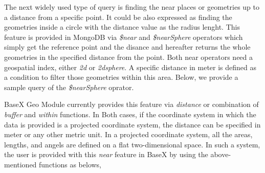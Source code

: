 \documentclass[a4paper,12pt]{article}
\begin{document}

The next widely used type of query is finding the near places or geometries up to a distance from a specific point. It could be also expressed as finding the geometries inside a circle with the distance value as the radius lenght. This feature is provided in MongoDB via \textit{\$near} and \textit{\$nearSphere} operators which simply get the reference point and the disance and hereafter returns the whole geometries in the specified distance from the point. Both near operators need a geospatial index, either \textit{2d} or \textit{2dsphere}. A specific distance in meter is defined as a condition to filter those geometries within this area. Below, we provide a sample query of the \textit{\$nearSphere} oprator.  
\vspace{10px}
\vspace{10px}
BaseX Geo Module currently provides this feature via \textit{distance} or combination of \textit{buffer} and \textit{within} functions. In Both cases, if the coordinate system in which the data is provided is a projected coordinate system, the distance can be specified in meter or any other metric unit. In a projected coordinate system, all the areas, lengths, and angels are defined on a flat two-dimensional space. In such a system, the user is provided with this \textit{near} feature in BaseX by using the above-mentioned functions as belows,
\vspace{10px}
\vspace{10px}
\end{document}
